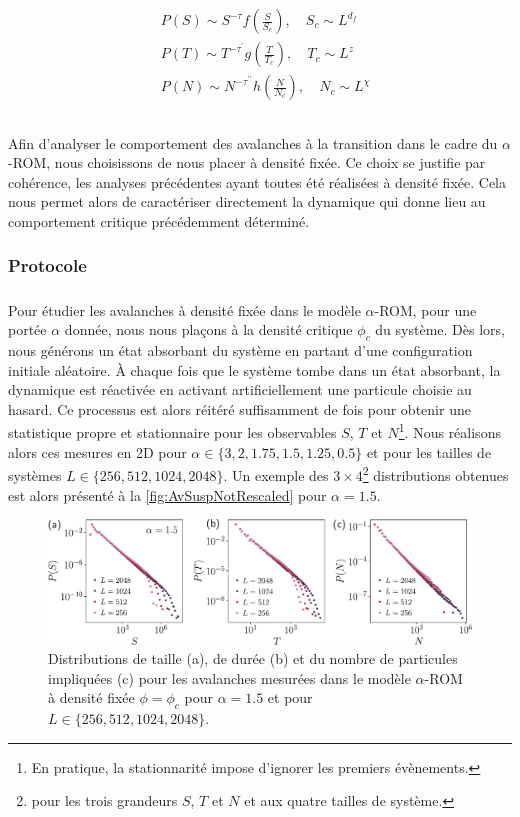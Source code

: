 \begin{equation}
	\begin{aligned}
		&P(S) \sim S^{-\tau}f\left( \frac{S}{S_c} \right), \quad S_c \sim L^{d_f}\\
		&P(T) \sim T^{-\tau^\prime}g\left( \frac{T}{T_c} \right), \quad T_c \sim L^{z}\\
		&P(N) \sim N^{-\tau^{\prime\prime}}h\left( \frac{N}{N_c} \right), \quad N_c \sim L^{\chi}\\
	\end{aligned}
	\label{eq:AvDistribSusp}
\end{equation}

\subparagraph{}Afin d'analyser le comportement des avalanches à la transition dans le cadre du $\alpha$-ROM, nous choisissons de nous placer à densité fixée. Ce choix se justifie par cohérence, les analyses précédentes ayant toutes été réalisées à densité fixée. Cela nous permet alors de caractériser directement la dynamique qui donne lieu au comportement critique précédemment déterminé.

\subsubsection{Protocole}

\subparagraph{}Pour étudier les avalanches à densité fixée dans le modèle $\alpha$-ROM, pour une portée $\alpha$ donnée, nous nous plaçons à la densité critique $\phi_c$ du système. Dès lors, nous générons un état absorbant du système en partant d'une configuration initiale aléatoire. \`A chaque fois que le système tombe dans un état absorbant, la dynamique est réactivée en activant artificiellement une particule choisie au hasard. Ce processus est alors réitéré suffisamment de fois pour obtenir une statistique propre et stationnaire pour les observables $S$, $T$ et $N$\footnote{En pratique, la stationnarité impose d'ignorer les premiers évènements.}. Nous réalisons alors ces mesures en 2D pour $\alpha \in \{ 3, 2, 1.75, 1.5, 1.25, 0.5\}$ et pour les tailles de systèmes $L \in \{ 256, 512, 1024, 2048 \}$. Un exemple des $3\times 4$\footnote{pour les trois grandeurs $S$, $T$ et $N$ et aux quatre tailles de système.} distributions obtenues est alors présenté à la \autoref{fig:AvSuspNotRescaled} pour $\alpha = 1.5$.

\begin{figure}[h]
	\centering
	\includegraphics[width=\textwidth]{Chapitre3/Figures/Avalanches/Av_alpha15_edited.pdf}
	\caption{Distributions de taille (a), de durée (b) et du nombre de particules impliquées (c) pour les avalanches mesurées dans le modèle $\alpha$-ROM à densité fixée $\phi=\phi_c$ pour $\alpha = 1.5$ et pour $L \in \{ 256, 512, 1024, 2048 \}$.}
	\label{fig:AvSuspNotRescaled}
\end{figure}

